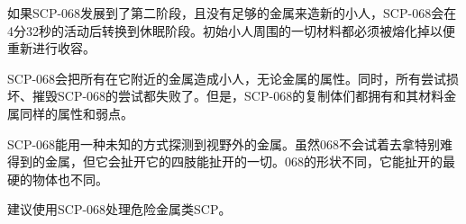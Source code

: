 如果SCP-068发展到了第二阶段，且没有足够的金属来造新的小人，SCP-068会在4分32秒的活动后转换到休眠阶段。初始小人周围的一切材料都必须被熔化掉以便重新进行收容。

SCP-068会把所有在它附近的金属造成小人，无论金属的属性。同时，所有尝试损坏、摧毁SCP-068的尝试都失败了。但是，SCP-068的复制体们都拥有和其材料金属同样的属性和弱点。

SCP-068能用一种未知的方式探测到视野外的金属。虽然068不会试着去拿特别难得到的金属，但它会扯开它的四肢能扯开的一切。068的形状不同，它能扯开的最硬的物体也不同。

建议使用SCP-068处理危险金属类SCP。



